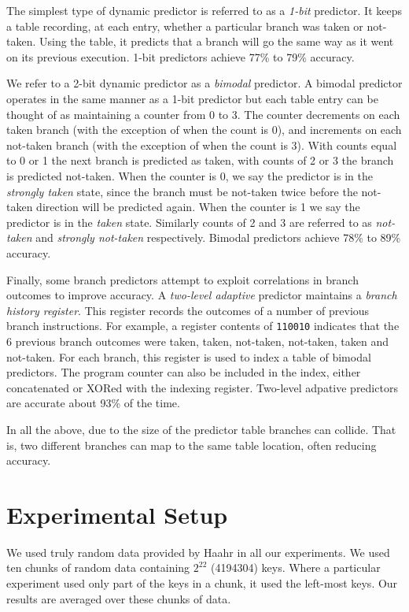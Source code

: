 \documentclass[acmtocl]{acmtrans2m}
\begin{document}
The simplest type of dynamic predictor is referred to 
as a \textit{1-bit} predictor. It keeps a table recording, at each entry, whether a particular branch was taken or not-taken. 
Using the table, it predicts 
that a branch
will go the same way as it went on its previous execution. 1-bit predictors achieve 77\% to 79\% accuracy.

We refer to a 2-bit dynamic predictor as a \textit{bimodal} predictor. A bimodal predictor operates in the same manner as a 1-bit predictor but each table entry
can be thought of  as maintaining a counter from 0 to 3. The counter decrements on each
taken branch (with the exception of when the count is 0), and increments on each not-taken branch (with the exception of when the count is 3). With
counts equal to 0 or 1 the next branch is predicted as taken, with counts of 2 or 3 the branch is predicted not-taken. 
When the counter is 0, we say the predictor is in the \textit{strongly taken} state, since the branch must be not-taken twice before the not-taken
direction will be predicted again. When the counter is 1 we say the predictor is in the \textit{taken} state. Similarly counts of 2 and 3 are referred
to as \textit{not-taken} and \textit{strongly not-taken} respectively. Bimodal predictors achieve 78\% to 89\% accuracy.

Finally, some branch predictors attempt to exploit correlations in branch outcomes to improve accuracy. A \textit{two-level adaptive} predictor maintains
a \textit{branch history register}. This register records the outcomes of a number of previous branch instructions. For example, a register contents 
of \texttt{110010} indicates that the 6 previous 
branch outcomes were taken, taken, not-taken, not-taken, taken and not-taken.
For each branch, this register is used to index a table of bimodal predictors.
The program counter can also be included in the index, either concatenated or XORed with the indexing register. Two-level adpative
predictors are accurate about 93\% of the time.

In all the above, due to the size of the predictor table branches can collide. That is, two 
different branches can map to the same table location, often reducing accuracy.

\section{Experimental Setup}
 
We used truly random data provided by Haahr \citeyear{Random} in all our experiments. We used ten chunks of random data containing $2^{22}$ (4194304) keys.
Where a particular experiment used only part of the keys in a chunk, it used the left-most keys.
Our results are averaged over these chunks of data.
\end{document}
